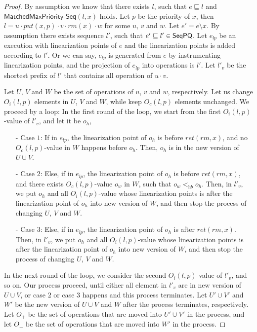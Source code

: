 \begin {proof}

By assumption we know that there exists $l$, such that $e \sqsubseteq l$ and $\mathsf{MatchedMaxPriority\text{-}Seq}(l,x)$ holds. Let $p$ be the priority of $x$, then $l=u \cdot \textit{put}(x,p) \cdot v \cdot \textit{rm}(x) \cdot w$ for some $u$, $v$ and $w$. Let $e' = e \setminus x$. By assumption there exists sequence $l'$, such that $e' \sqsubseteq l' \in \mathsf{SeqPQ}$. Let $e_{\textit{lp}}$ be an execution with linearization points of $e$ and the linearization points is added according to $l'$. Or we can say, $e_{\textit{lp}}$ is generated from $e$ by instrumenting linearization points, and the projection of $e_{\textit{lp}}$ into operations is $l'$. Let $l'_v$ be the shortest prefix of $l'$ that contains all operation of $u \cdot v$.

Let $U$, $V$ and $W$ be the set of operations of $u$, $v$ and $w$, respectively. Let us change $O_i(l,p)$ elements in $U$, $V$ and $W$, while keep $O_c(l,p)$ elements unchanged. We proceed by a loop: In the first round of the loop, we start from the first $O_i(l,p)$-value of $l'_v$, and let it be $o_h$,

\begin{itemize}
\setlength{\itemsep}{0.5pt}
\item[-] Case $1$: If in $e_{\textit{lp}}$, the linearization point of $o_h$ is before $\textit{ret}(\textit{rm},x)$, and no $O_c(l,p)$-value in $W$ happens before $o_h$. Then, $o_h$ is in the new version of $U \cup V$.

\item[-] Case $2$: Else, if in $e_{\textit{lp}}$, the linearization point of $o_h$ is before $\textit{ret}(\textit{rm},x)$, and there exists $O_c(l,p)$-value $o_w$ in $W$, such that $o_w <_{\textit{hb}} o_h$. Then, in $l'_v$, we put $o_h$ and all $O_i(l,p)$-value whose linearization points is after the linearization point of $o_h$ into new version of $W$, and then stop the process of changing $U$, $V$ and $W$.

\item[-] Case $3$: Else, if in $e_{\textit{lp}}$, the linearization point of $o_h$ is after $\textit{ret}(\textit{rm},x)$. Then, in $l'_v$, we put $o_h$ and all $O_i(l,p)$-value whose linearization points is after the linearization point of $o_h$ into new version of $W$, and then stop the process of changing $U$, $V$ and $W$.
\end{itemize}

In the next round of the loop, we consider the second $O_i(l,p)$-value of $l'_v$, and so on. Our process proceed, until either all element in $l'_v$ are in new version of $U \cup V$, or case $2$ or case $3$ happens and this process terminates. Let $U' \cup V'$ and $W'$ be the new version of $U \cup V$ and $W$ after the process terminates, respectively. Let $O_+$ be the set of operations that are moved into $U' \cup V'$ in the process, and let $O_-$ be the set of operations that are moved into $W'$ in the process.


\end{proof}
